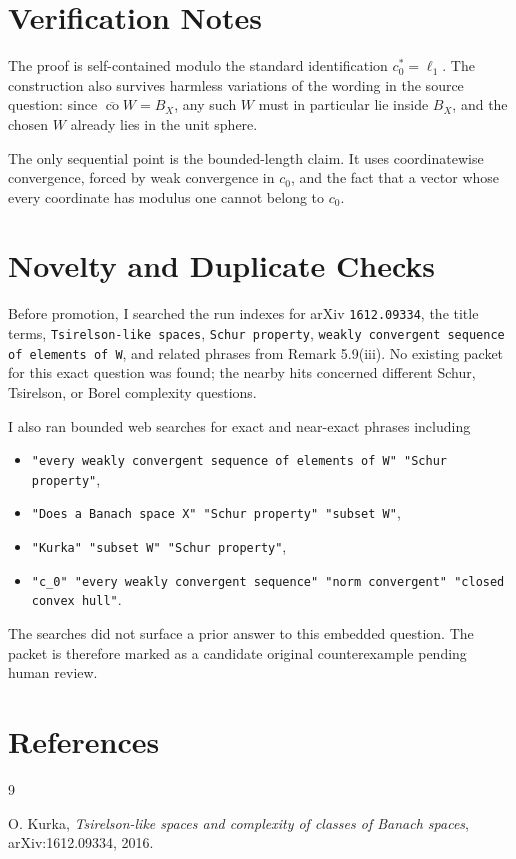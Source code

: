 \documentclass[11pt]{article}
\newcommand{\co}{\operatorname{co}}
\begin{document}
\section*{Verification Notes}

The proof is self-contained modulo the standard identification
\(c_0^*=\ell_1\).  The construction also survives harmless variations of
the wording in the source question: since \(\overline{\co} W=B_X\), any
such \(W\) must in particular lie inside \(B_X\), and the chosen \(W\)
already lies in the unit sphere.

The only sequential point is the bounded-length claim.  It uses
coordinatewise convergence, forced by weak convergence in \(c_0\), and
the fact that a vector whose every coordinate has modulus one cannot
belong to \(c_0\).

\section*{Novelty and Duplicate Checks}

Before promotion, I searched the run indexes for arXiv \texttt{1612.09334},
the title terms, \texttt{Tsirelson-like spaces}, \texttt{Schur property},
\texttt{weakly convergent sequence of elements of W}, and related phrases
from Remark 5.9(iii).  No existing packet for this exact question was
found; the nearby hits concerned different Schur, Tsirelson, or Borel
complexity questions.

I also ran bounded web searches for exact and near-exact phrases including
\begin{itemize}
\item \texttt{"every weakly convergent sequence of elements of W" "Schur property"},
\item \texttt{"Does a Banach space X" "Schur property" "subset W"},
\item \texttt{"Kurka" "subset W" "Schur property"},
\item \texttt{"c\_0" "every weakly convergent sequence" "norm convergent" "closed convex hull"}.
\end{itemize}
The searches did not surface a prior answer to this embedded question.
The packet is therefore marked as a candidate original counterexample
pending human review.

\section*{References}

\begin{thebibliography}{9}

O. Kurka,
\emph{Tsirelson-like spaces and complexity of classes of Banach spaces},
arXiv:1612.09334, 2016.

\end{thebibliography}
\end{document}
